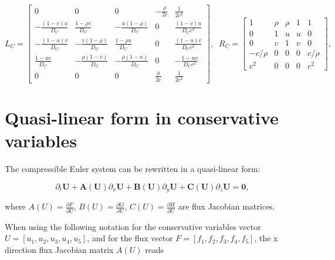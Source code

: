 \documentclass{article}
\begin{document}
\begin{equation}
L_C = \left[
    \begin{array}{ccccc}
      0 & 0 & 0 & -\frac{\rho}{2c} & \frac{1}{2c^2}\\
      -\frac{(1-v)u}{D_C} & \frac{1-\rho v}{D_C} & -\frac{u(1-\rho)}{D_C} & 0 & \frac{(1-v)u}{D_C c^2}\\
      -\frac{(1-u)v}{D_C} & -\frac{v(1-\rho)}{D_C} & \frac{1-\rho u}{D_C} & 0 & \frac{(1-u)v}{D_C c^2}\\
      \frac{1-u v}{D_C} & -\frac{\rho(1-v)}{D_C} & -\frac{\rho(1-u)}{D_C} & 0 & -\frac{1-uv}{D_C c^2}\\
      0 & 0 & 0&  \frac{\rho}{2c} & \frac{1}{2 c^2}
      \end{array}
  \right],\;\;
  R_C = \left[
    \begin{array}{ccccc}
      1       & \rho & \rho & 1 & 1 \\
      0       & 1    & u    & u & 0 \\
      0       & v    & 1    & v & 0 \\
      -c/\rho & 0    & 0    & 0 & c/\rho \\
      c^2     & 0    & 0    & 0 & c^2
    \end{array}
  \right],\;\;
\end{equation}

\section{Quasi-linear form in conservative variables}

The compressible Euler system can be rewritten in a quasi-linear form:

\begin{equation}
  \partial_t \mathbf{U} + \mathbf{A(U)} \partial_x \mathbf{U} + \mathbf{B(U)} \partial_y \mathbf{U} + \mathbf{C(U)} \partial_z \mathbf{U} = \mathbf{0},
\end{equation}

where $A(U)=\frac{\partial F}{\partial U}$, $B(U)=\frac{\partial G}{\partial U}$, $C(U)=\frac{\partial H}{\partial U}$ are flux Jacobian matrices.

When using the following notation for the conservative variables vector $U=[u_1, u_2, u_3, u_4, u_5]$, and for the flux vector $F=[f_1, f_2, f_3, f_4, f_5]$, the x direction flux Jacobian matrix $A(U)$ reads
\end{document}
